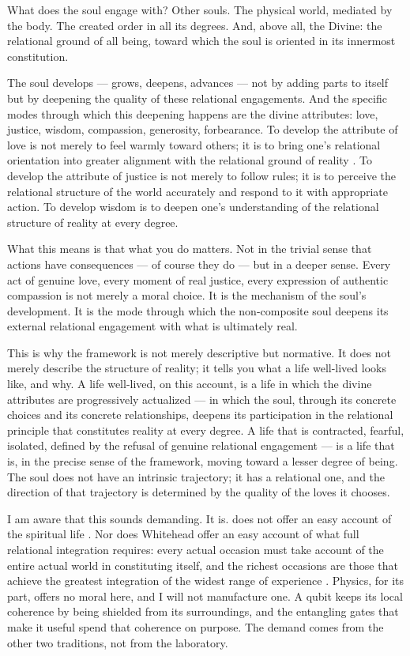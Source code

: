 What does the soul engage with?  Other souls.  The physical world, mediated by
the body.  The created order in all its degrees.  And, above all, the Divine:
the relational ground of all being, toward which the soul is oriented in its
innermost constitution.

The soul develops --- grows, deepens, advances --- not by adding parts to itself
but by deepening the quality of these relational engagements.  And the specific
modes through which this deepening happens are the divine attributes: love,
justice, wisdom, compassion, generosity, forbearance.  To develop the attribute
of love is not merely to feel warmly toward others; it is to bring one's
relational orientation into greater alignment with the relational ground of
reality \citep{HiddenWords,SelectionsAbdul,GleaningsBahaullah}.  To develop the
attribute of justice is not merely to follow rules; it is to perceive the
relational structure of the world accurately and respond to it with appropriate
action.  To develop wisdom is to deepen one's understanding of the relational
structure of reality at every degree.

What this means is that what you do matters.  Not in the trivial sense that
actions have consequences --- of course they do --- but in a deeper sense.  Every
act of genuine love, every moment of real justice, every expression of authentic
compassion is not merely a moral choice.  It is the mechanism of the soul's
development.  It is the mode through which the non-composite soul deepens its
external relational engagement with what is ultimately real.

This is why the framework is not merely descriptive but normative.  It does not
merely describe the structure of reality; it tells you what a life well-lived
looks like, and why.  A life well-lived, on this account, is a life in which the
divine attributes are progressively actualized --- in which the soul, through its
concrete choices and its concrete relationships, deepens its participation in
the relational principle that constitutes reality at every degree.  A life that
is contracted, fearful, isolated, defined by the refusal of genuine relational
engagement --- is a life that is, in the precise sense of the framework, moving
toward a lesser degree of being.  The soul does not have an intrinsic trajectory;
it has a relational one, and the direction of that trajectory is determined by
the quality of the loves it chooses.

I am aware that this sounds demanding.  It is.  \Bahaullah does not offer an
easy account of the spiritual life \citep{GleaningsBahaullah,HiddenWords}.  Nor
does Whitehead offer an easy account of what full relational integration requires:
every actual occasion must take account of the entire actual world in constituting
itself, and the richest occasions are those that achieve the greatest integration
of the widest range of experience \citep{Whitehead1929}.  Physics, for its part,
offers no moral here, and I will not manufacture one.  A qubit keeps its local
coherence by being shielded from its surroundings, and the entangling gates
that make it useful spend that coherence on purpose.  The demand comes from the other two
traditions, not from the laboratory.

